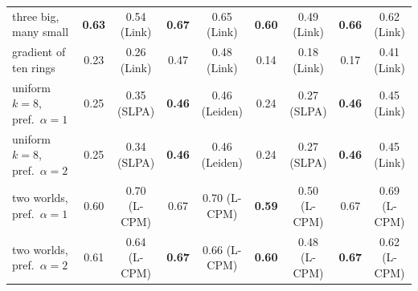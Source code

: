 \begin{table}[t]
\begin{ruledtabular}
\begin{tabular}{lcccccccc}
three big, many small & \textbf{0.63} & 0.54 (Link) & \textbf{0.67} & 0.65 (Link) & \textbf{0.60} & 0.49 (Link) & \textbf{0.66} & 0.62 (Link) \\
gradient of ten rings & 0.23 & 0.26 (Link) & 0.47 & 0.48 (Link) & 0.14 & 0.18 (Link) & 0.17 & 0.41 (Link) \\
\hline
uniform $k{=}8$, pref.\ $\alpha{=}1$ & 0.25 & 0.35 (SLPA) & \textbf{0.46} & 0.46 (Leiden) & 0.24 & 0.27 (SLPA) & \textbf{0.46} & 0.45 (Link) \\
uniform $k{=}8$, pref.\ $\alpha{=}2$ & 0.25 & 0.34 (SLPA) & \textbf{0.46} & 0.46 (Leiden) & 0.24 & 0.27 (SLPA) & \textbf{0.46} & 0.45 (Link) \\
two worlds, pref.\ $\alpha{=}1$ & 0.60 & 0.70 (L-CPM) & 0.67 & 0.70 (L-CPM) & \textbf{0.59} & 0.50 (L-CPM) & 0.67 & 0.69 (L-CPM) \\
two worlds, pref.\ $\alpha{=}2$ & 0.61 & 0.64 (L-CPM) & \textbf{0.67} & 0.66 (L-CPM) & \textbf{0.60} & 0.48 (L-CPM) & \textbf{0.67} & 0.62 (L-CPM) \\
\end{tabular}
\end{ruledtabular}
\end{table}
